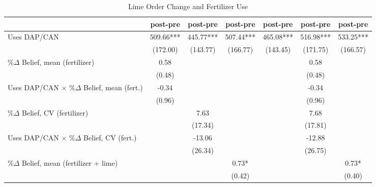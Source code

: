 \begin{table}[htbp]
\centering
\hspace*{-1.2cm}
\begin{threeparttable}
\small
\caption{Lime Order Change and Fertilizer Use}
\label{tab:A2lime_int}
\begin{tabular}{l cccccc}
\hline
\hline
                    &\multicolumn{1}{c}{post-pre}&\multicolumn{1}{c}{post-pre}&\multicolumn{1}{c}{post-pre}&\multicolumn{1}{c}{post-pre}&\multicolumn{1}{c}{post-pre}&\multicolumn{1}{c}{post-pre}\\
\hline
Uses DAP/CAN        &      509.66***&      445.77***&      507.44***&      465.08***&      516.98***&      533.25***\\
                    &    (172.00)   &    (143.77)   &    (166.77)   &    (143.45)   &    (171.75)   &    (166.57)   \\
$\% \Delta$ Belief, mean (fertilizer)&        0.58   &               &               &               &        0.58   &               \\
                    &      (0.48)   &               &               &               &      (0.48)   &               \\
Uses DAP/CAN $\times$ $\% \Delta$ Belief, mean (fert.)&       -0.34   &               &               &               &       -0.34   &               \\
                    &      (0.96)   &               &               &               &      (0.96)   &               \\
$\% \Delta$ Belief, CV (fertilizer)&               &        7.63   &               &               &        7.68   &               \\
                    &               &     (17.34)   &               &               &     (17.81)   &               \\
Uses DAP/CAN $\times$ $\% \Delta$ Belief, CV (fert.)&               &      -13.06   &               &               &      -12.88   &               \\
                    &               &     (26.34)   &               &               &     (26.75)   &               \\
$\% \Delta$ Belief, mean (fertilizer + lime)&               &               &        0.73*  &               &               &        0.73*  \\
                    &               &               &      (0.42)   &               &               &      (0.40)   \\

\end{tabular}
\end{threeparttable}
\end{table}
